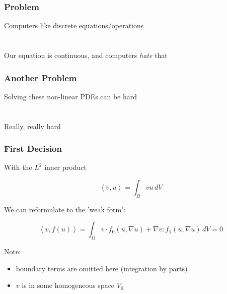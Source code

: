 \documentclass{beamer}
\begin{document}

\begin{frame}
\begin{center}
\frametitle{Problem}

Computers like discrete equations/operations\\

~\\

~\\

Our equation is continuous, and computers \emph{hate} that

\end{center}
\end{frame}


\begin{frame}
\begin{center}
\frametitle{Another Problem}

Solving these non-linear PDEs can be hard\\

~\\

~\\

Really, really hard

\end{center}
\end{frame}


\begin{frame}
\begin{center}
\frametitle{First Decision}

With the $L^2$ inner product

\begin{equation*}
\left\langle v, u \right\rangle = \int_\Omega v u \, dV
\end{equation*}

We can reformulate to the 'weak form':

\begin{equation*}
\left\langle v, f \left( u \right) \right\rangle = \int_\Omega v \cdot f_0 \left( u, \nabla u \right) + \nabla v : f_1 \left( u, \nabla u \right) \, dV = 0
\end{equation*}

Note:

\begin{itemize}

\item boundary terms are omitted here (integration by parts)

\item $v$ is in some homogeneous space $V_0$

\end{itemize}

\end{center}
\end{frame}
\end{document}
